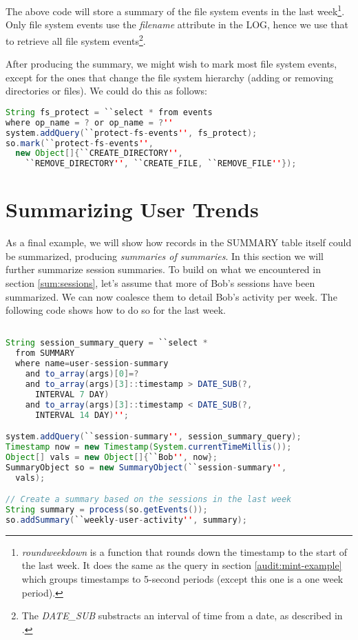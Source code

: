 \noindent
The above code will store a summary of the file system events in the last week\footnote{\emph{roundweekdown} is a function that rounds down the timestamp to the start of the last week. It does the same as the query in section \ref{audit:mint-example} which groups timestamps to 5-second periods (except this one is a one week period).}. Only file system events use the \emph{filename} attribute in the LOG, hence we use that to retrieve all file system events\footnote{The \emph{DATE\_SUB} substracts an interval of time from a date, as described in \cite{pgsql-gen}.}.

After producing the summary, we might wish to mark most file system events, except for the ones that change the file system hierarchy (adding or removing directories or files). We could do this as follows:

\begin{lstlisting}[language=Java]
String fs_protect = ``select * from events 
where op_name = ? or op_name = ?''
system.addQuery(``protect-fs-events'', fs_protect);
so.mark(``protect-fs-events'', 
  new Object[]{``CREATE_DIRECTORY'', 
    ``REMOVE_DIRECTORY'', ``CREATE_FILE, ``REMOVE_FILE''});
\end{lstlisting}

\section{Summarizing User Trends}

As a final example, we will show how records in the SUMMARY table itself could be summarized, producing \emph{summaries of summaries}. In this section we will further summarize session summaries. To build on what we encountered in section \ref{sum:sessions}, let's assume that more of Bob's sessions have been summarized. We can now coalesce them to detail Bob's activity per week. The following code shows how to do so for the last week.

\begin{lstlisting}[language=Java]

String session_summary_query = ``select * 
  from SUMMARY 
  where name=user-session-summary 
    and to_array(args)[0]=? 
    and to_array(args)[3]::timestamp > DATE_SUB(?, 
      INTERVAL 7 DAY) 
    and to_array(args)[3]::timestamp < DATE_SUB(?, 
      INTERVAL 14 DAY)'';

system.addQuery(``session-summary'', session_summary_query);
Timestamp now = new Timestamp(System.currentTimeMillis());
Object[] vals = new Object[]{``Bob'', now};
SummaryObject so = new SummaryObject(``session-summary'', 
  vals);

// Create a summary based on the sessions in the last week
String summary = process(so.getEvents());
so.addSummary(``weekly-user-activity'', summary);
\end{lstlisting}


